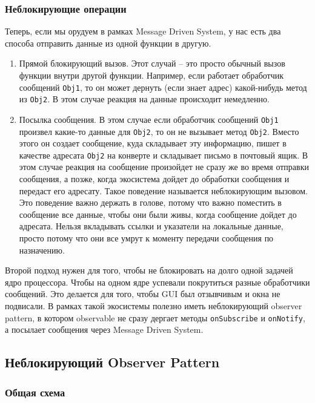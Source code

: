 \subsubsection{Неблокирующие операции}

Теперь, если мы орудуем в рамках Message Driven System, у нас есть два способа отправить данные из одной функции в другую.
\begin{enumerate}
\item Прямой блокирующий вызов.
Этот случай -- это просто обычный вызов функции внутри другой функции.
Например, если работает обработчик сообщений \verb"Obj1", то он может дернуть (если знает адрес) какой-нибудь метод из \verb"Obj2".
В этом случае реакция на данные происходит немедленно.

\item Посылка сообщения.
В этом случае если обработчик сообщений \verb"Obj1" произвел какие-то данные для \verb"Obj2", то он не вызывает метод \verb"Obj2".
Вместо этого он создает сообщение, куда складывает эту информацию, пишет в качестве адресата \verb"Obj2" на конверте и складывает письмо в почтовый ящик.
В этом случае реакция на сообщение произойдет не сразу же во время отправки сообщения, а позже, когда экосистема дойдет до обработки сообщения и передаст его адресату.
Такое поведение называется неблокирующим вызовом.
Это поведение важно держать в голове, потому что важно поместить в сообщение все данные, чтобы они были живы, когда сообщение дойдет до адресата.
Нельзя вкладывать ссылки и указатели на локальные данные, просто потому что они все умрут к моменту передачи сообщения по назначению.
\end{enumerate}
Второй подход нужен для того, чтобы не блокировать на долго одной задачей ядро процессора.
Чтобы на одном ядре успевали покрутиться разные обработчики сообщений.
Это делается для того, чтобы GUI был отзывчивым и окна не подвисали.
В рамках такой экосистемы полезно иметь неблокирующий observer pattern, в котором observable не сразу дергает методы \verb"onSubscribe" и \verb"onNotify", а посылает сообщения через Message Driven System.

\subsection{Неблокирующий Observer Pattern}
\label{section::ObserverNonBlocking}

\subsubsection{Общая схема}

